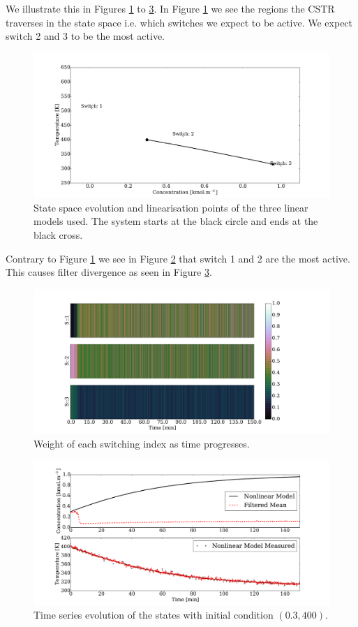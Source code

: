 \documentclass[../masters.tex]{subfiles}
\begin{document}
We illustrate this in Figures \ref{fig_3mod_s_w} to \ref{fig_3mod_t_w}. In Figure \ref{fig_3mod_s_w} we see the regions the CSTR traverses in the state space i.e. which switches we expect to be active. We expect switch 2 and 3 to be the most active.
\begin{figure}[H] 
\centering
\includegraphics[scale=0.3]{skf_s3_s_w.pdf}
\caption{State space evolution and linearisation points of the three linear models used. The system starts at the black circle and ends at the black cross.}
\label{fig_3mod_s_w}
\end{figure}
Contrary to Figure \ref{fig_3mod_s_w} we see in Figure \ref{fig_3mod_w_w} that switch 1 and 2 are the most active. This causes filter divergence as seen in Figure \ref{fig_3mod_t_w}.
\begin{figure}[H] 
\centering
\includegraphics[scale=0.3]{skf_s3_w_w.pdf}
\caption{Weight of each switching index as time progresses.}
\label{fig_3mod_w_w}
\end{figure}
\begin{figure}[H] 
\centering
\includegraphics[scale=0.3]{skf_s3_t_w.pdf}
\caption{Time series evolution of the states with initial condition $(0.3, 400)$.}
\label{fig_3mod_t_w}
\end{figure}
\end{document}

